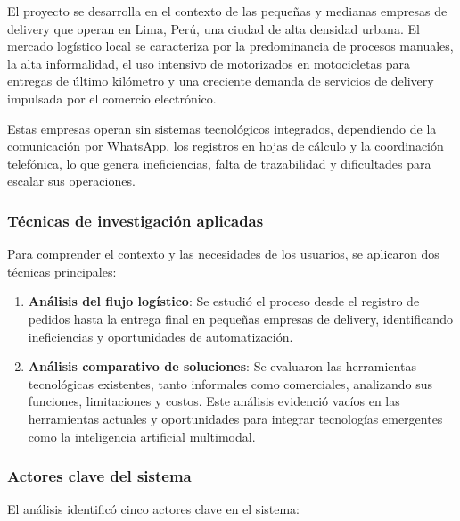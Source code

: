 El proyecto se desarrolla en el contexto de las pequeñas y medianas empresas de delivery que operan en Lima, Perú, una ciudad de alta densidad urbana. El mercado logístico local se caracteriza por la predominancia de procesos manuales, la alta informalidad, el uso intensivo de motorizados en motocicletas para entregas de último kilómetro y una creciente demanda de servicios de delivery impulsada por el comercio electrónico.

Estas empresas operan sin sistemas tecnológicos integrados, dependiendo de la comunicación por WhatsApp, los registros en hojas de cálculo y la coordinación telefónica, lo que genera ineficiencias, falta de trazabilidad y dificultades para escalar sus operaciones.

\subsubsection{Técnicas de investigación aplicadas}

Para comprender el contexto y las necesidades de los usuarios, se aplicaron dos técnicas principales:

\begin{enumerate}
    \item \textbf{Análisis del flujo logístico}: Se estudió el proceso desde el registro de pedidos hasta la entrega final en pequeñas empresas de delivery, identificando ineficiencias y oportunidades de automatización.
    
    \item \textbf{Análisis comparativo de soluciones}: Se evaluaron las herramientas tecnológicas existentes, tanto informales como comerciales, analizando sus funciones, limitaciones y costos. Este análisis evidenció vacíos en las herramientas actuales y oportunidades para integrar tecnologías emergentes como la inteligencia artificial multimodal.
\end{enumerate}

\subsubsection{Actores clave del sistema}

El análisis identificó cinco actores clave en el sistema:

